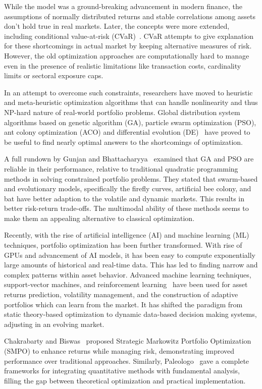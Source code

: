 \documentclass[11pt]{article}
\begin{document}
While the model was a ground-breaking advancement in modern finance, the assumptions of normally distributed returns and stable correlations among assets don't hold true in real markets. Later, the concepts were more extended, including conditional value-at-risk (CVaR)~\cite{cvar2002}. CVaR attempts to give explanation for these shortcomings in actual market by keeping alternative measures of risk. However, the old optimization approaches are computationally hard to manage even in the presence of realistic limitations like transaction costs, cardinality limits or sectoral exposure caps.

In an attempt to overcome such constraints, researchers have moved to heuristic and meta-heuristic optimization algorithms that can handle nonlinearity and thus NP-hard nature of real-world portfolio problems. Global distribution system algorithms based on genetic algorithm (GA), particle swarm optimization (PSO), ant colony optimization (ACO) and differential evolution (DE)~\cite{sinha2015algorithm} have proved to be useful to find nearly optimal answers to the shortcomings of optimization.

A full rundown by Gunjan and Bhattacharyya~\cite{gunjan2020} examined that GA and PSO are reliable in their performance, relative to traditional quadratic programming methods in solving constrained portfolio problems. They stated that swarm-based and evolutionary models, specifically the firefly curves, artificial bee colony, and bat have better adaption to the volatile and dynamic markets. This results in better risk-return trade-offs. The multimodal ability of these methods seems to make them an appealing alternative to classical optimization.

Recently, with the rise of artificial intelligence (AI) and machine learning (ML) techniques, portfolio optimization has been further transformed. With rise of GPUs and advancement of AI models, it has been easy to compute exponentially large amounts of historical and real-time data. This has led to finding narrow and complex patterns within asset behavior. Advanced machine learning techniques, support-vector machines, and reinforcement learning~\cite{rl2020} have been used for asset returns prediction, volatility management, and the construction of adaptive portfolios which can learn from the market. It has shifted the paradigm from static theory-based optimization to dynamic data-based decision making systems, adjusting in an evolving market.

Chakrabarty and Biswas~\cite{chakrabarty2019strategic} proposed Strategic Markowitz Portfolio Optimization (SMPO) to enhance returns while managing risk, demonstrating improved performance over traditional approaches. Similarly, Paleologo~\cite{paleologo2021advanced} gave a complete frameworks for integrating quantitative methods with fundamental analysis, filling the gap between theoretical optimization and practical implementation.
\end{document}
